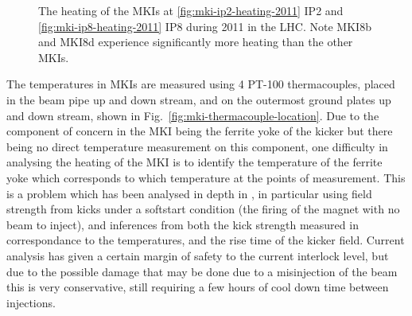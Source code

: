 \begin{figure}
\begin{center}
\end{center}
\label{fig:mki-heating-2011}
\caption{The heating of the MKIs at \ref{fig:mki-ip2-heating-2011} IP2 and \ref{fig:mki-ip8-heating-2011} IP8 during 2011 in the LHC. Note MKI8b and MKI8d experience significantly more heating than the other MKIs.}
\end{figure}

The temperatures in MKIs are measured using 4 PT-100 thermacouples, placed in the beam pipe up and down stream, and on the outermost ground plates up and down stream, shown in Fig.~\ref{fig:mki-thermacouple-location}. Due to the component of concern in the MKI being the ferrite yoke of the kicker but there being no direct temperature measurement on this component, one difficulty in analysing the heating of the MKI is to identify the temperature of the ferrite yoke which corresponds to which temperature at the points of measurement. This is a problem which has been analysed in depth in \cite{Barnes:mkiHeating}, in particular using field strength from kicks under a softstart condition (the firing of the magnet with no beam to inject), and inferences from both the kick strength measured in correspondance to the temperatures, and the rise time of the kicker field. Current analysis has given a certain margin of safety to the current interlock level, but due to the possible damage that may be done due to a misinjection of the beam this is very conservative, still requiring a few hours of cool down time between injections.

